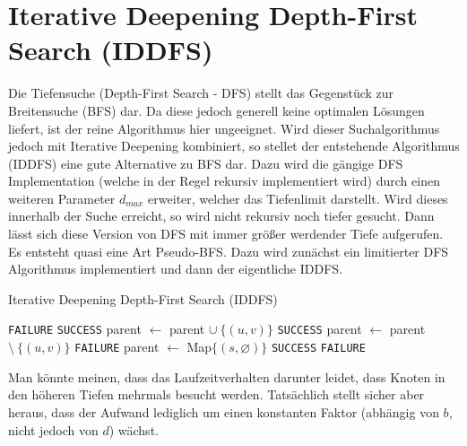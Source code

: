 \documentclass{whswinvcbook}
\begin{document}
\section{Iterative Deepening Depth-First Search (IDDFS)}
Die Tiefensuche (Depth-First Search - DFS) stellt das Gegenstück zur Breitensuche (BFS) dar. Da diese jedoch generell keine optimalen Lösungen liefert, ist der reine Algorithmus hier ungeeignet. Wird dieser Suchalgorithmus jedoch mit Iterative Deepening kombiniert, so stellet der entstehende Algorithmus (IDDFS) eine gute Alternative zu BFS dar. Dazu wird die gängige DFS Implementation (welche in der Regel rekursiv implementiert wird) durch einen weiteren Parameter $d_{max}$ erweiter, welcher das Tiefenlimit darstellt. Wird dieses innerhalb der Suche erreicht, so wird nicht rekursiv noch tiefer gesucht. Dann lässt sich diese Version von DFS mit immer größer werdender Tiefe aufgerufen. Es entsteht quasi eine Art Pseudo-BFS. Dazu wird zunächst ein limitierter DFS Algorithmus implementiert und dann der eigentliche IDDFS.
\begin{algorithm}[H]
    \caption{Iterative Deepening Depth-First Search (IDDFS)}\label{alg-iddfs}
    \begin{algorithmic}[1]
                \State \Return \texttt{FAILURE}
            \EndIf
                \State \Return \texttt{SUCCESS}
            \EndIf
                    \State parent $\gets$ parent $\cup\:\{(u,v)\}$
                        \State \Return \texttt{SUCCESS}
                    \EndIf
                    \State parent $\gets$ parent $\setminus\:\{(u,v)\}$
                \EndIf
            \EndFor
            \State \Return \texttt{FAILURE}
        \EndFunction
            \State parent $\gets$ Map$\{(s,\varnothing)\}$
                    \State \Return \texttt{SUCCESS}
                \EndIf
            \EndFor
            \State \Return \texttt{FAILURE}
        \EndFunction
    \end{algorithmic}
\end{algorithm}
Man könnte meinen, dass das Laufzeitverhalten darunter leidet, dass Knoten in den höheren Tiefen mehrmals besucht werden. Tatsächlich stellt sicher aber heraus, dass der Aufwand lediglich um einen konstanten Faktor (abhängig von $b$, nicht jedoch von $d$) wächst.\cite{ai}
\end{document}
